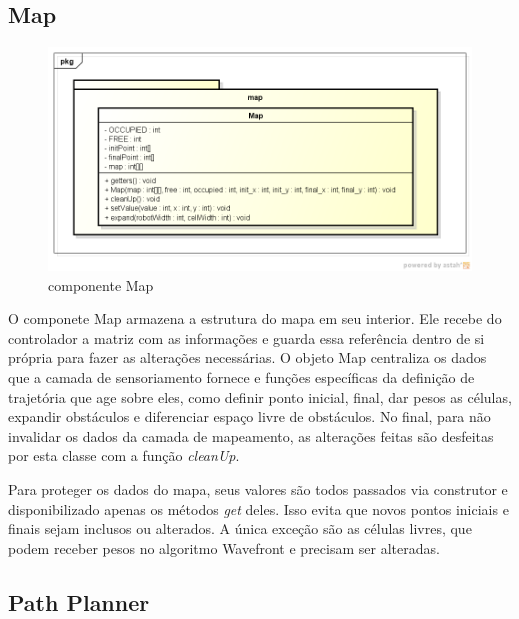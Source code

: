 \subsection{Map}

\begin{figure}[h]
	\centering
	\label{fig23}
		\includegraphics[keepaspectratio=true,scale=0.5]{figuras/pkgmap.png}
	\caption{componente Map}
\end{figure}

O componete Map armazena a estrutura do mapa em seu interior. Ele recebe do controlador a matriz com as informações e guarda essa referência dentro de si própria para fazer as alterações necessárias. O objeto Map centraliza os dados que a camada de sensoriamento fornece e funções específicas da definição de trajetória que age sobre eles, como definir ponto inicial, final, dar pesos as células, expandir obstáculos e diferenciar espaço livre de obstáculos. No final, para não invalidar os dados da camada de mapeamento, as alterações feitas são desfeitas por esta classe com a função \textit{cleanUp}.

Para proteger os dados do mapa, seus valores são todos passados via construtor e disponibilizado apenas os métodos \textit{get} deles. Isso evita que novos pontos iniciais e finais sejam inclusos ou alterados. A única exceção são as células livres, que podem receber pesos no algoritmo Wavefront e precisam ser alteradas.

\subsection{Path Planner}

